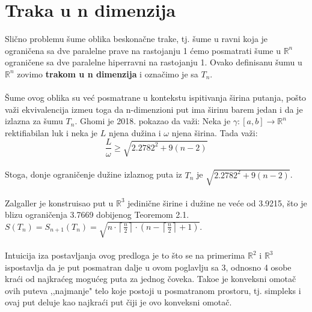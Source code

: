 \documentclass[11pt,letter]{article}
\begin{document}
\section[Traka u n dimenzija]{Traka u n dimenzija}
\bigskip
 Sli\v cno problemu \v sume oblika beskona\v cne trake, tj. \v sume u ravni koja je ograni\v cena sa dve paralelne prave na rastojanju 1 \' cemo posmatrati \v sume u $\mathbb{R}^n$ ograni\v cene sa dve paralelne hiperravni na rastojanju 1. Ovako definisanu \v sumu u $\mathbb{R}^n$ zovimo \textbf{trakom u n dimenzija} i ozna\v cimo je sa $T_n$.
\\
\smallskip
\\
\indent \v Sume ovog oblika su ve\' c posmatrane u kontekstu ispitivanja \v sirina putanja, po\v sto va\v zi ekvivalencija izme\dj u toga da n-dimenzioni put ima \v sirinu barem jedan i da je izlazna za \v sumu $T_n$. Ghomi je 2018. pokazao da va\v zi:
\teo[Ghomi] Neka je $\gamma: [a,b]\to \mathbb{R}^n$ rektifiabilan luk i neka je $L$ njena du\v zina i $\omega$ njena \v sirina. Tada va\v zi:
$$\frac{L}{\omega}\geqslant \sqrt{2.2782^2+9(n-2)}$$
\\
\indent Stoga, donje ograni\v cenje du\v zine izlaznog puta iz $T_n$ je $ \sqrt{2.2782^2+9(n-2)}$.
\\
\\
Zalgaller je konstruisao put u $\mathbb{R}^3$ jedini\v cne \v sirine i du\v zine ne ve\' ce od 3.9215, \v sto je blizu ograni\v cenja 3.7669 dobijenog Teoremom 2.1.
\\
\pred $S(T_n)=S_{n+1}(T_n)=\sqrt{n\cdot\left\lceil\frac{n}{2}\right\rceil\cdot\left( n-\left\lceil\frac{n}{2}\right\rceil+1\right)}$.
\\
\\
\indent Intuicija iza postavljanja ovog predloga je to \v sto se na primerima $\mathbb{R}^2$ i $\mathbb{R}^3$ ispostavlja da je put posmatran dalje u ovom poglavlju sa 3, odnosno 4 osobe kra\' ci od najkra\' ceg mogu\' ceg puta za jednog \v coveka. Tako\dj e je konveksni omota\v c ovih puteva ,,najmanje" telo koje postoji u posmatranom prostoru, tj. simpleks i ovaj put deluje kao najkra\' ci put \v ciji je ovo konveksni omota\v c.


\smallskip
\end{document}
